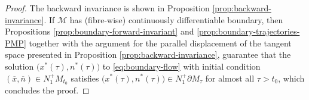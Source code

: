 \documentclass[reqno]{amsart}
\theoremstyle{definition}
\numberwithin{equation}{section}
\newcommand{\M}{\mathscr{M}}
\begin{document}

\begin{proof} 
The backward invariance is shown in Proposition \ref{prop:backward-invariance}. If $\M$ has (fibre-wise) continuously differentiable boundary, then Propositions \ref{prop:boundary-forward-invariant} and \ref{prop:boundary-trajectories-PMP} together with the argument for the parallel displacement of the tangent space presented in  Proposition \ref{prop:backward-invariance}, guarantee that the solution $\big(x^*(\tau),n^*(\tau)\big)$ to \eqref{eq:boundary-flow} with initial condition  $(\overline x, \overline n)\in N^+_1 M_{t_0}$ satisfies $\big(x^*(\tau),n^*(\tau)\big)\in  N^+_{1}\partial M_{\tau}$ for almost all $\tau > t_0$, which concludes the proof.
\end{proof}
\end{document}
